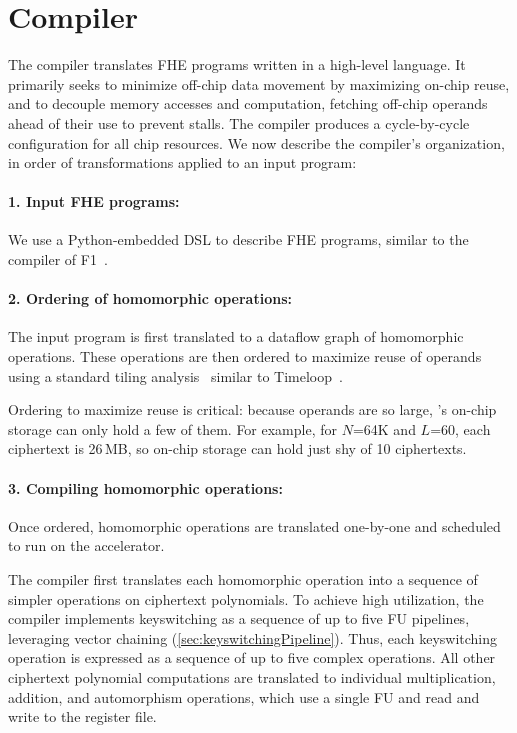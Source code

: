 \section{Compiler}\label{sec:algorithmicInsights}
\label{sec:compiler}

The \name compiler translates FHE programs written in a
high-level language.
It primarily seeks to minimize off-chip data movement by maximizing on-chip reuse,
and to decouple memory accesses and computation, fetching off-chip operands ahead
of their use to prevent stalls.
The compiler produces a cycle-by-cycle configuration for all chip resources.
We now describe the compiler's organization, in order of transformations applied to 
an input program:

\paragraph{1. Input FHE programs:} We use a Python-embedded DSL to describe FHE programs,
similar to the compiler of F1~\cite{feldmann:micro21:f1}.

\paragraph{2. Ordering of homomorphic operations:} The input program is first translated 
to a dataflow graph of homomorphic operations.
These operations are then ordered to maximize reuse of operands using a standard tiling 
analysis~\cite{parashar:ispass19:timeloop,yang:asplos20:interstellar,huang:isca21:cosa}
similar to Timeloop~\cite{parashar:ispass19:timeloop}.


Ordering to maximize reuse is critical: because operands are so large, \name's on-chip storage
can only hold a few of them. For example, for $N$=64K  and $L$=60,
each ciphertext is 26\,MB, so on-chip storage can hold just shy of 10 ciphertexts.

\paragraph{3. Compiling homomorphic operations:} Once ordered,
homomorphic operations are translated one-by-one and scheduled to run
on the accelerator.

The compiler first translates each homomorphic operation into a sequence of simpler operations on ciphertext polynomials.
To achieve high utilization, the compiler implements keyswitching as a sequence of up to five FU pipelines,
leveraging vector chaining (\autoref{sec:keyswitchingPipeline}).
Thus, each keyswitching operation is expressed as a sequence of up to five complex operations.
All other ciphertext polynomial computations are translated to individual multiplication, 
addition, and automorphism operations, which use a single FU and read and write to 
the register file.

